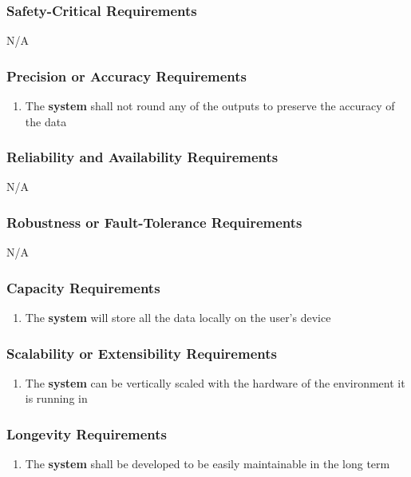 \documentclass[12pt, titlepage]{article}
\begin{document}
    \subsubsection{Safety-Critical Requirements}
        N/A
    \subsubsection{Precision or Accuracy Requirements}
        \begin{enumerate}
            \item The \textbf{system} shall not round any of the outputs to preserve the accuracy of the data
        \end{enumerate}
    \subsubsection{Reliability and Availability Requirements}
        N/A
    \subsubsection{Robustness or Fault-Tolerance Requirements}
        N/A
    \subsubsection{Capacity Requirements}
        \begin{enumerate}
            \item The \textbf{system} will store all the data locally on the user's device
        \end{enumerate}
    \subsubsection{Scalability or Extensibility Requirements}
        \begin{enumerate}
            \item The \textbf{system} can be vertically scaled with the hardware of the environment it is running in
        \end{enumerate}
    \subsubsection{Longevity Requirements}
        \begin{enumerate}
            \item The \textbf{system} shall be developed to be easily maintainable in the long term
        \end{enumerate}
\end{document}
